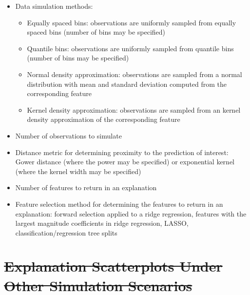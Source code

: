 \documentclass[AMS,STIX2COL]{WileyNJD-v2}\usepackage[]{graphicx}\usepackage[]{color}
\providecommand{\DIFdel}[1]{{\protect\color{red}\sout{#1}}}                      %
\providecommand{\DIFdelbegin}{} %
\newcommand{\DIFscaledelfig}{0.5}
\newlength{\DIFdelgraphicswidth} %
\newlength{\DIFdelgraphicsheight} %
\newcommand{\DIFdelincludegraphics}[2][]{%
\sbox{\DIFdelgraphicsbox}{\DIFOincludegraphics[#1]{#2}}%
\settoboxwidth{\DIFdelgraphicswidth}{\DIFdelgraphicsbox} %
\settoboxtotalheight{\DIFdelgraphicsheight}{\DIFdelgraphicsbox} %
\scalebox{\DIFscaledelfig}{%
\parbox[b]{\DIFdelgraphicswidth}{\usebox{\DIFdelgraphicsbox}\\[-\baselineskip] \rule{\DIFdelgraphicswidth}{0em}}\llap{\resizebox{\DIFdelgraphicswidth}{\DIFdelgraphicsheight}{%
\setlength{\unitlength}{\DIFdelgraphicswidth}%
\begin{picture}(1,1)%
\thicklines\linethickness{2pt} %
{\color[rgb]{1,0,0}\put(0,0){\framebox(1,1){}}}%
{\color[rgb]{1,0,0}\put(0,0){\line( 1,1){1}}}%
{\color[rgb]{1,0,0}\put(0,1){\line(1,-1){1}}}%
\end{picture}%
}\hspace*{3pt}}} %
} %
\DeclareRobustCommand{\DIFdelbegin}{\DIFOdelbegin \let\includegraphics\DIFdelincludegraphics} %
\begin{document}
\begin{itemize}

\item Data simulation methods:

\begin{itemize}
\item Equally spaced bins: observations are uniformly sampled from equally spaced bins (number of bins may be specified)
\item Quantile bins: observations are uniformly sampled from quantile bins (number of bins may be specified)
\item Normal density approximation: observations are sampled from a normal distribution with mean and standard deviation computed from the corresponding feature
\item Kernel density approximation: observations are sampled from an kernel density approximation of the corresponding feature
\end{itemize}

\item Number of observations to simulate

\item Distance metric for determining proximity to the prediction of interest: Gower distance (where the power may be specified) or exponential kernel (where the kernel width may be specified)

\item Number of features to return in an explanation

\item Feature selection method for determining the features to return in an explanation: forward selection applied to a ridge regression, features with the largest magnitude coefficients in ridge regression, LASSO, classification/regression tree splits

\end{itemize}

\DIFdelbegin \section{\DIFdel{Explanation Scatterplots Under Other Simulation Scenarios}} %
\addtocounter{section}{-1}%
\end{document}
